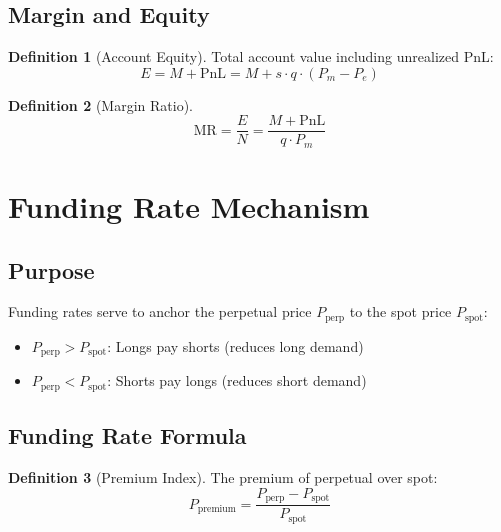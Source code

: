 \documentclass[11pt,a4paper]{article}
\theoremstyle{definition}
\newtheorem{definition}{Definition}
\begin{document}
\subsection{Margin and Equity}

\begin{definition}[Account Equity]
Total account value including unrealized PnL:
\begin{equation}
E = M + \text{PnL} = M + s \cdot q \cdot (P_m - P_e)
\end{equation}
\end{definition}

\begin{definition}[Margin Ratio]
\begin{equation}
\text{MR} = \frac{E}{N} = \frac{M + \text{PnL}}{q \cdot P_m}
\end{equation}
\end{definition}

\section{Funding Rate Mechanism}

\subsection{Purpose}

Funding rates serve to anchor the perpetual price $P_{\text{perp}}$ to the spot price $P_{\text{spot}}$:

\begin{itemize}
\item $P_{\text{perp}} > P_{\text{spot}}$: Longs pay shorts (reduces long demand)
\item $P_{\text{perp}} < P_{\text{spot}}$: Shorts pay longs (reduces short demand)
\end{itemize}

\subsection{Funding Rate Formula}

\begin{definition}[Premium Index]
The premium of perpetual over spot:
\begin{equation}
P_{\text{premium}} = \frac{P_{\text{perp}} - P_{\text{spot}}}{P_{\text{spot}}}
\end{equation}
\end{definition}
\end{document}
